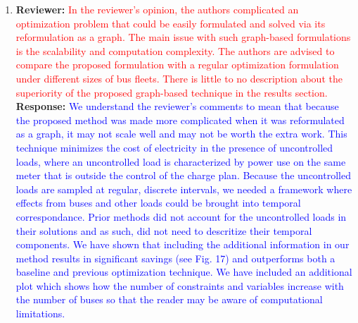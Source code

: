 \documentclass{article}
\newcommand\formatfeedback[2]
{%
	\textbf{Reviewer:} \textcolor{red}{#1} 
	\leavevmode\\[0.1in] \textbf{Response:} \textcolor{blue}{#2}
}
\begin{document}
\begin{enumerate}
	\item \formatfeedback{In the reviewer's opinion, the authors complicated an optimization problem that could be easily formulated and solved via its reformulation as a graph. The main issue with such graph-based formulations is the scalability and computation complexity. The authors are advised to compare the proposed formulation with a regular optimization formulation under different sizes of bus fleets. There is little to no description about the superiority of the proposed graph-based technique in the results section.}{We understand the reviewer's comments to mean that because the proposed method was made more complicated when it was reformulated as a graph, it may not scale well and may not be worth the extra work. This technique minimizes the cost of electricity in the presence of uncontrolled loads, where an uncontrolled load is characterized by power use on the same meter that is outside the control of the charge plan. Because the uncontrolled loads are sampled at regular, discrete intervals, we needed a framework where effects from buses and other loads could be brought into temporal correspondance. Prior methods did not account for the uncontrolled loads in their solutions and as such, did not need to descritize their temporal components. We have shown that including the additional information in our method results in significant savings (see Fig. 17) and outperforms both a baseline and previous optimization technique. We have included an additional plot which shows how the number of constraints and variables increase with the number of buses so that the reader may be aware of computational limitations. 
 }
\end{enumerate}
\end{document}
